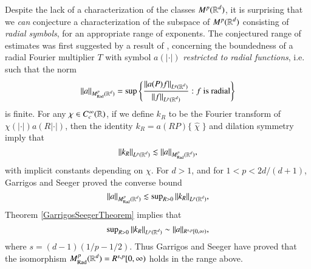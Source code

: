 Despite the lack of a characterization of the classes $M^p(\operatorname{\mathbb{R}}^d)$, it is surprising that we \emph{can} conjecture a characterization of the subspace of $M^p(\operatorname{\mathbb{R}}^d)$ consisting of \emph{radial symbols}, for an appropriate range of exponents. The conjectured range of estimates was first suggested by a result of \cite{GarrigosandSeeger}, concerning the boundedness of a radial Fourier multiplier $T$ with symbol $a(|\cdot|)$ \emph{restricted to radial functions}, i.e. such that the norm
%
\begin{equation}
  \| a \|_{M^p_{\text{Rad}}(\operatorname{\mathbb{R}}^d)} = \sup \left\{ \frac{\| a(P)f \|_{L^q(\operatorname{\mathbb{R}}^d)}}{\| f \|_{L^p(\operatorname{\mathbb{R}}^d)}} : \text{$f$ is radial} \right\}
\end{equation}
%
is finite. For any $\chi \in C_c^\infty(\operatorname{\mathbb{R}})$, if we define $k_R$ to be the Fourier transform of $\chi(|\cdot|) a(R |\cdot|)$, then the identity $k_R = a(RP) \{\;\! \widehat{\chi}\;\! \}$ and dilation symmetry imply that
%
\begin{equation}
  \| k_R \|_{L^p(\operatorname{\mathbb{R}}^d)} \lesssim \| a \|_{M^p_{\text{Rad}}(\operatorname{\mathbb{R}}^d)},
\end{equation}
%
with implicit constants depending on $\chi$. For $d > 1$, and for $1 < p < 2d/(d+1)$, Garrigos and Seeger proved \cite{GarrigosandSeeger} the converse bound
%
\begin{equation} \label{RadialMultiplierRadialBound}
    \| a \|_{M^p_{\text{Rad}}(\operatorname{\mathbb{R}}^d)} \lesssim \sup\nolimits_{R > 0} \| k_R \|_{L^p(\operatorname{\mathbb{R}}^d)},
\end{equation}
%
Theorem \ref{GarrigosSeegerTheorem} implies that
%
\begin{equation}
  \sup\nolimits_{R > 0} \| k_R \|_{L^p(\operatorname{\mathbb{R}}^d)} \sim \| a \|_{R^{s,p}[0,\infty)},
\end{equation}
%
where $s = (d-1)(1/p - 1/2)$. Thus Garrigos and Seeger have proved that the isomorphism $M^p_{\text{Rad}}(\operatorname{\mathbb{R}}^d) = R^{s,p}[0,\infty)$ holds in the range above.

